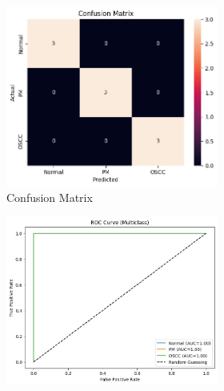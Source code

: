 \documentclass[a4paper,12pt]{article}
\begin{document}
\begin{figure}[H]
	\begin{subfigure}[b]{0.45\textwidth}
		\centering
		\begin{subfigure}[b]{0.49\textwidth}
			\centering
			\includegraphics[width=\textwidth]{images/3prc.png}  %
			\caption{Confusion Matrix}
			\label{fig:fig5}
		\end{subfigure}
		\hfill
		\begin{subfigure}[b]{0.49\textwidth}
			\centering
			\includegraphics[width=\textwidth]{images/3prr.png}  %

\end{subfigure}
\end{subfigure}
\end{figure}
\end{document}
